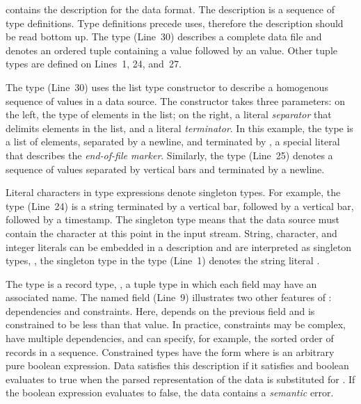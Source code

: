  contains the \padsml{} description for the
\dibbler{} data format.  The description is a sequence of type
definitions.  Type definitions precede uses, therefore the description
should be read bottom up.
The type  (Line~30) describes a complete \dibbler{} data
file and denotes an ordered tuple containing a
 value followed by an  value.
Other tuple types are defined on Lines~1, 24, and~27.

The type  (Line~30) uses the list type constructor
 to describe a homogenous sequence of values in a data
source.  The  constructor takes three parameters: on the
left, the type of elements in the list; on the right, a literal
\emph{separator} that delimits elements in the list, and a literal
\emph{terminator}.  In this example, the type  is a list of
 elements, separated by a newline, and terminated by
, a special literal that describes the \emph{end-of-file
  marker}.  Similarly, the  type (Line~25) denotes a
sequence of  values separated by vertical bars and
terminated by a newline.

Literal characters in type expressions denote singleton types.  For
example, the  type (Line~24) is a string terminated by a
vertical bar, followed by a vertical bar, followed by a timestamp.  The
singleton type  means that the data source must contain the
character  at this point in the input stream.  String,
character, and integer literals can be embedded in a description and
are interpreted as singleton types, \eg{}, the singleton type
 in the  type (Line~1) 
denotes the string literal .

The type  is a record type, \ie{}, a tuple type in
which each field may have an associated name.  The named field
 (Line~9) illustrates two other features of
\padsml: dependencies and constraints.  Here, 
depends on the previous field  and is constrained to be
less than that value.  In practice, constraints may be complex, have
multiple dependencies, and can specify, for example, the sorted order
of records in a sequence.  Constrained types have the form \cd{[x:T |
e]} where  is an arbitrary pure boolean expression.  Data
satisfies this description if it satisfies  and boolean 
evaluates to true when the parsed representation of the data is
substituted for .  If the boolean expression evaluates to false,
the data contains a \textit{semantic} error.


